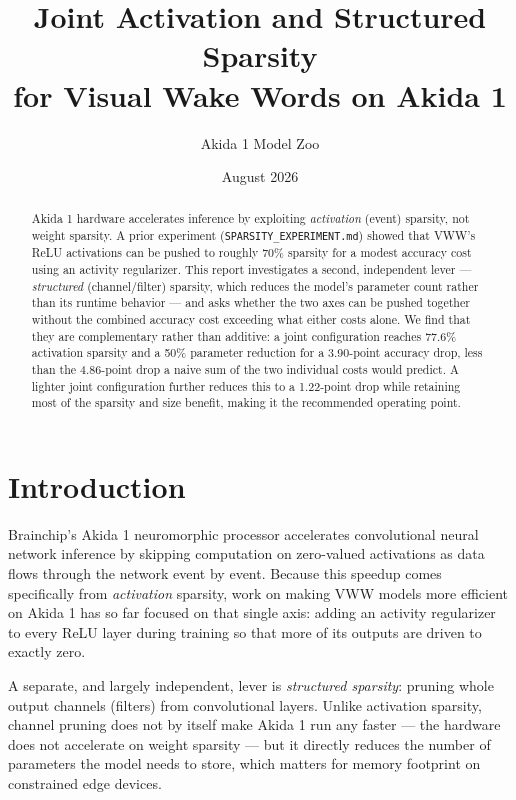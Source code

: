 \documentclass[11pt]{article}
\title{Joint Activation and Structured Sparsity\\ for Visual Wake Words on Akida 1}
\author{Akida 1 Model Zoo}
\date{August 2026}
\newcommand{\code}[1]{\texttt{#1}}
\begin{document}
\maketitle

\begin{abstract}
Akida 1 hardware accelerates inference by exploiting \emph{activation} (event) sparsity, not weight sparsity. A prior experiment (\code{SPARSITY\_EXPERIMENT.md}) showed that VWW's ReLU activations can be pushed to roughly 70\% sparsity for a modest accuracy cost using an activity regularizer. This report investigates a second, independent lever --- \emph{structured} (channel/filter) sparsity, which reduces the model's parameter count rather than its runtime behavior --- and asks whether the two axes can be pushed together without the combined accuracy cost exceeding what either costs alone. We find that they are complementary rather than additive: a joint configuration reaches 77.6\% activation sparsity and a 50\% parameter reduction for a 3.90-point accuracy drop, less than the 4.86-point drop a naive sum of the two individual costs would predict. A lighter joint configuration further reduces this to a 1.22-point drop while retaining most of the sparsity and size benefit, making it the recommended operating point.
\end{abstract}

\tableofcontents

\section{Introduction}

Brainchip's Akida 1 neuromorphic processor accelerates convolutional neural network inference by skipping computation on zero-valued activations as data flows through the network event by event. Because this speedup comes specifically from \emph{activation} sparsity, work on making VWW models more efficient on Akida 1 has so far focused on that single axis: adding an activity regularizer to every ReLU layer during training so that more of its outputs are driven to exactly zero.

A separate, and largely independent, lever is \emph{structured sparsity}: pruning whole output channels (filters) from convolutional layers. Unlike activation sparsity, channel pruning does not by itself make Akida 1 run any faster --- the hardware does not accelerate on weight sparsity --- but it directly reduces the number of parameters the model needs to store, which matters for memory footprint on constrained edge devices.
\end{document}
